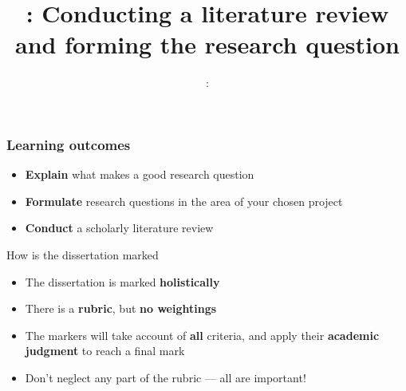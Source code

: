 \usepackage{../../beamerthemeFalmouthGamesAcademy}
\usepackage{multimedia}
\graphicspath{ {../../} }


\usepackage[normalem]{ulem}
\usepackage{wasysym}

\usepackage{algpseudocode}

\usepackage{pdfpages}

\usepackage{fancyvrb}

\usetikzlibrary{arrows,automata}




\title{\sessionnumber: Conducting a literature review and forming the research question}
\subtitle{\modulecode: \moduletitle}

\frame{\titlepage} 

\begin{frame}
	\frametitle{Learning outcomes}
	\begin{itemize}
		\item \textbf{Explain} what makes a good research question
		\item \textbf{Formulate} research questions in the area of your chosen project
		\item \textbf{Conduct} a scholarly literature review
	\end{itemize}
\end{frame}

\begin{frame}{How is the dissertation marked}
	\begin{itemize}
		\pause\item The dissertation is marked \textbf{holistically}
		\pause\item There is a \textbf{rubric}, but \textbf{no weightings}
		\pause\item The markers will take account of \textbf{all} criteria,
		    and apply their \textbf{academic judgment} to reach a final mark
		\pause\item Don't neglect any part of the rubric --- all are important!
	\end{itemize}
\end{frame}








